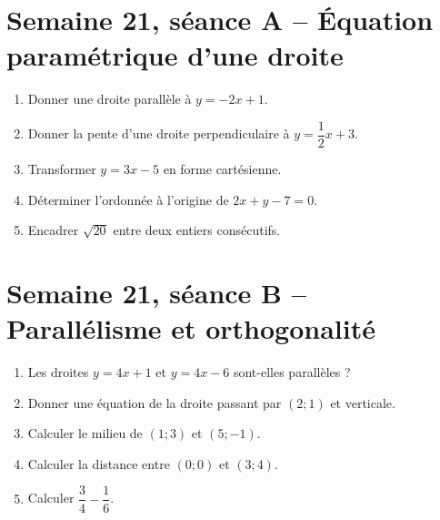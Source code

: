 \section{Semaine 21, séance A -- Équation paramétrique d'une droite}
\begin{enumerate}
  \item Donner une droite parallèle à $y=-2x+1$.
  \item Donner la pente d'une droite perpendiculaire à $y=\dfrac12x+3$.
  \item Transformer $y=3x-5$ en forme cartésienne.
  \item Déterminer l'ordonnée à l'origine de $2x+y-7=0$.
  \item Encadrer $\sqrt{20}$ entre deux entiers consécutifs.
\end{enumerate}

\section{Semaine 21, séance B -- Parallélisme et orthogonalité}
\begin{enumerate}
  \item Les droites $y=4x+1$ et $y=4x-6$ sont-elles parallèles ?
  \item Donner une équation de la droite passant par $(2;1)$ et verticale.
  \item Calculer le milieu de $(1;3)$ et $(5;-1)$.
  \item Calculer la distance entre $(0;0)$ et $(3;4)$.
  \item Calculer $\dfrac34-\dfrac16$.
\end{enumerate}

